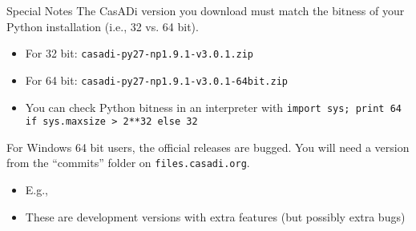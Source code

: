 \documentclass[xcolor=dvipsnames]{beamer}
\begin{document}
\begin{frame}{Special Notes}
    The CasADi version you download must match the bitness of your Python installation (i.e., 32 vs. 64 bit).
    \begin{itemize}
        \item For 32 bit: \texttt{casadi-py27-np1.9.1-v3.0.1.zip}
        \item For 64 bit: \texttt{casadi-py27-np1.9.1-v3.0.1-64bit.zip}
        \item You can check Python bitness in an interpreter with \lstinline[style=python]!import sys; print 64 if sys.maxsize > 2**32 else 32!
    \end{itemize}
    
    \medskip
    
    For Windows 64 bit users, the official releases are bugged. You will need a version from the ``commits'' folder on \texttt{files.casadi.org}.
    \begin{itemize}
        \item E.g., 
        \item These are development versions with extra features (but possibly extra bugs)
    \end{itemize}
\end{frame}
\end{document}
